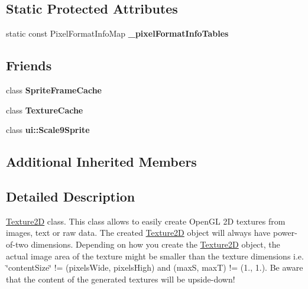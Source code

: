 \subsection*{Static Protected Attributes}
\begin{DoxyCompactItemize}
\item 
\mbox{\label{classTexture2D_a582708a5334a1ac5ed3997823181b633}} 
static const Pixel\+Format\+Info\+Map {\bfseries \+\_\+pixel\+Format\+Info\+Tables}
\end{DoxyCompactItemize}
\subsection*{Friends}
\begin{DoxyCompactItemize}
\item 
\mbox{\label{classTexture2D_a84172cf86f750ec7a2016517c8658a7a}} 
class {\bfseries Sprite\+Frame\+Cache}
\item 
\mbox{\label{classTexture2D_a6aed23c13f403937c0a3c2b4119e8934}} 
class {\bfseries Texture\+Cache}
\item 
\mbox{\label{classTexture2D_afcf5b358e405758f9b3a21c606ca004e}} 
class {\bfseries ui\+::\+Scale9\+Sprite}
\end{DoxyCompactItemize}
\subsection*{Additional Inherited Members}


\subsection{Detailed Description}
\hyperlink{classTexture2D}{Texture2D} class. This class allows to easily create Open\+GL 2D textures from images, text or raw data. The created \hyperlink{classTexture2D}{Texture2D} object will always have power-\/of-\/two dimensions. Depending on how you create the \hyperlink{classTexture2D}{Texture2D} object, the actual image area of the texture might be smaller than the texture dimensions i.\+e. \char`\"{}content\+Size\char`\"{} != (pixels\+Wide, pixels\+High) and (maxS, maxT) != (1., 1.). Be aware that the content of the generated textures will be upside-\/down! 

